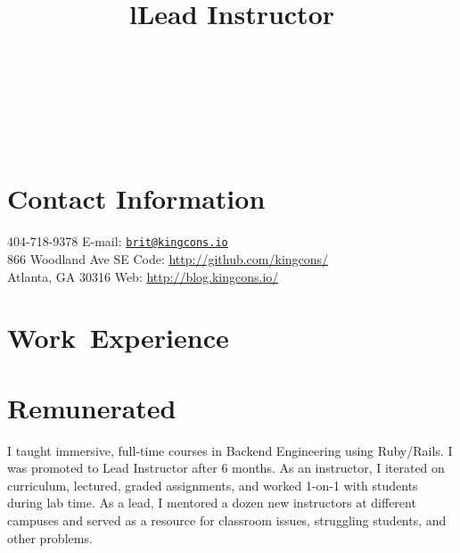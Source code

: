 \documentclass[margintitle,line]{res}
\renewcommand{\subsection}[1]{\section{\normalfont #1}}
\begin{document}

\begin{resume}

\begin{format}
\\
\title{l}\\
\body\\
\end{format}



\section{Contact Information}

404-718-9378 \hfill {E-mail:} \href{mailto:brit@kingcons.io}{\nolinkurl{brit@kingcons.io}} \\
866 Woodland Ave SE \hfill {Code:} \url{http://github.com/kingcons/} \\
Atlanta, GA 30316 \hfill {Web:} \url{http://blog.kingcons.io/} \\


\section{\mbox{Work Experience}}

\subsection{Remunerated}

\title{Lead Instructor}
\begin{position}
  I taught immersive, full-time courses in Backend Engineering using Ruby/Rails.
  I was promoted to Lead Instructor after 6 months. As an instructor, I iterated
  on curriculum, lectured, graded assignments, and worked 1-on-1 with students
  during lab time. As a lead, I mentored a dozen new instructors at different
  campuses and served as a resource for classroom issues, struggling students,
  and other problems.
\end{position}


\end{resume}
\end{document}
